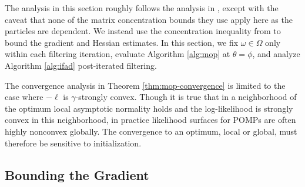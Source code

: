 


The analysis in this section roughly follows the analysis in \cite{mahoney16}, except with the caveat that none of the matrix concentration bounds they use apply here as the particles are dependent. We instead use the concentration inequality from \cite{delMoral11} to bound the gradient and Hessian estimates. In this section, we fix $\omega \in \Omega$ only within each filtering iteration, evaluate Algorithm \ref{alg:mop} at $\theta=\phi$, and analyze Algorithm \ref{alg:ifad} post-iterated filtering.


The convergence analysis in Theorem \ref{thm:mop-convergence} is limited to the case where $-\ell$ is $\gamma$-strongly convex. Though it is true that in a neighborhood of the optimum local asymptotic normality holds and the log-likelihood is strongly convex in this neighborhood, in practice likelihood surfaces for POMPs are often highly nonconvex globally. The convergence to an optimum, local or global, must therefore be sensitive to initialization.  

\subsection{Bounding the Gradient}


